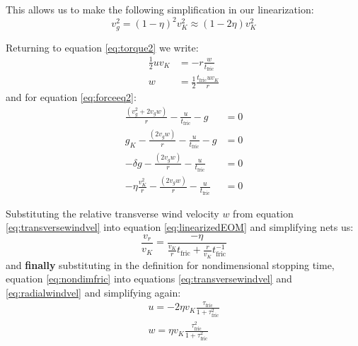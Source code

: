 \documentclass[12pt]{article}
\begin{document}
This allows us to make the following simplification in our linearization: 
$$v_g^2 = (1-\eta)^2v_K^2 \approx (1-2\eta)v_K^2 $$

Returning to equation \ref{eq:torque2} we write:
\begin{align}
    \frac{1}{2}uv_K &= -r\frac{w}{t_{\mathrm{fric}}} \\
    \label{eq:transversewindvel}
    w &= \frac{1}{2} \frac{t_{\mathrm{fric}} uv_K}{r}
\end{align}
and for equation \ref{eq:forceeq2}:
\begin{align}
    \frac{(v_g^2 +2v_gw)}{r} - \frac{u}{t_{\mathrm{fric}}} - g &= 0 \\
    g_K - \frac{(2v_gw)}{r}  - \frac{u}{t_{\mathrm{fric}}} - g &= 0 \\
    -\delta g - \frac{(2v_gw)}{r}  - \frac{u}{t_{\mathrm{fric}}} &= 0 \\
    \label{eq:linearizedEOM}
    -\eta \frac{v_K^2}{r} - \frac{(2v_gw)}{r}  - \frac{u}{t_{\mathrm{fric}}} &= 0 
\end{align}

Substituting the relative transverse wind velocity $w$ from equation \ref{eq:transversewindvel} into equation \ref{eq:linearizedEOM} and simplifying nets us:
\begin{equation}
   \label{eq:radialwindvel}
    \frac{v_r}{v_K} = \frac{-\eta}{ \frac{v_K}{r}t_{\mathrm{fric}} + \frac{r}{v_K}t_{\mathrm{fric}}^{-1}}
\end{equation}
and \textbf{finally} substituting in the definition for nondimensional stopping time, equation \ref{eq:nondimfric} into equations \ref{eq:transversewindvel} and \ref{eq:radialwindvel} and simplifying again:
\begin{align}
    \label{eq:nondimradialwindvel}
    u = -2\eta v_K \frac{\tau_{\mathrm{fric}}}{1 + \tau_{\mathrm{fric}}^2} \\
    \label{eq:nondimtransversewindvel}
    w = \eta v_K \frac{\tau_{\mathrm{fric}}^2}{1 + \tau_{\mathrm{fric}}^2}
\end{align}
\end{document}
